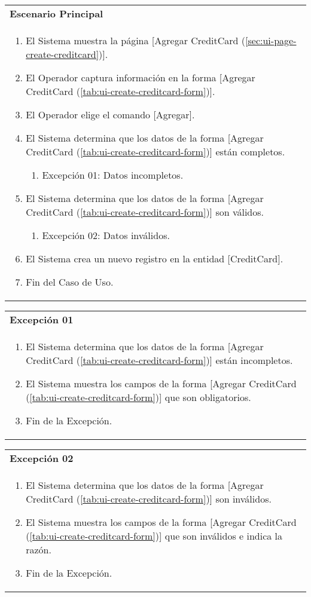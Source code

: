 	\begin{tabular}{ p{15.5cm} }
		\textbf{Escenario Principal} \\
		\begin{enumerate}
			\item El Sistema muestra la p\'agina [Agregar CreditCard (\ref{sec:ui-page-create-creditcard})].
			\item El Operador captura informaci\'on en la forma [Agregar CreditCard (\ref{tab:ui-create-creditcard-form})].
			\item El Operador elige el comando [Agregar].
			\item El Sistema determina que los datos de la forma [Agregar CreditCard (\ref{tab:ui-create-creditcard-form})] est\'an completos.
				\begin{enumerate}
					\item Excepci\'on 01: Datos incompletos.
				\end{enumerate}
			\item El Sistema determina que los datos de la forma [Agregar CreditCard (\ref{tab:ui-create-creditcard-form})] son v\'alidos.
				\begin{enumerate}
					\item Excepci\'on 02: Datos inv\'alidos.
				\end{enumerate}
			\item El Sistema crea un nuevo registro en la entidad [CreditCard].
			\item Fin del Caso de Uso.
		\end{enumerate}
	\end{tabular}
	
	\begin{tabular}{ p{15.5cm} }
		\textbf{Excepci\'on 01} \\
		\begin{enumerate}
			\item El Sistema determina que los datos de la forma [Agregar CreditCard (\ref{tab:ui-create-creditcard-form})] est\'an incompletos.
			\item El Sistema muestra los campos de la forma [Agregar CreditCard (\ref{tab:ui-create-creditcard-form})] que son obligatorios.
			\item Fin de la Excepci\'on.
		\end{enumerate}
	\end{tabular}
	
	\begin{tabular}{ p{15.5cm} }
		\textbf{Excepci\'on 02} \\
		\begin{enumerate}
			\item El Sistema determina que los datos de la forma [Agregar CreditCard (\ref{tab:ui-create-creditcard-form})] son inv\'alidos.
			\item El Sistema muestra los campos de la forma [Agregar CreditCard (\ref{tab:ui-create-creditcard-form})] que son inv\'alidos e indica la raz\'on.
			\item Fin de la Excepci\'on.
		\end{enumerate}
	\end{tabular}
	
